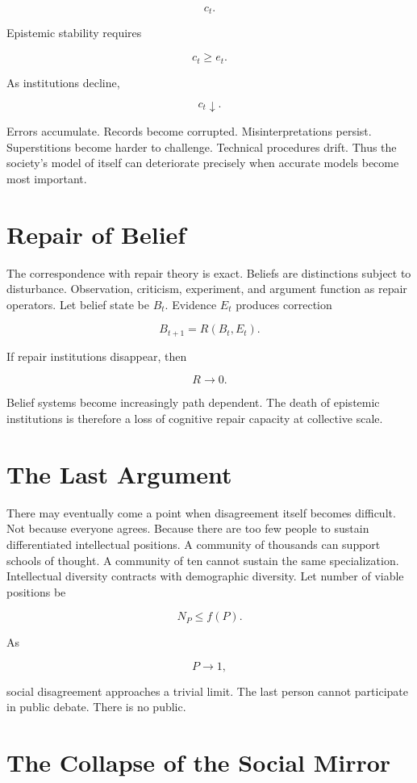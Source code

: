 \documentclass[11pt,oneside]{book}
\theoremstyle{definition}
\theoremstyle{remark}
\begin{document}
\[
c_t.
\]

Epistemic stability requires

\[
c_t\geq e_t.
\]

As institutions decline,

\[
c_t\downarrow.
\]

Errors accumulate. Records become corrupted. Misinterpretations persist. Superstitions become harder
to challenge. Technical procedures drift. Thus the society's model of itself can deteriorate
precisely when accurate models become most important.

\section{Repair of Belief}

The correspondence with repair theory is exact. Beliefs are distinctions subject to disturbance.
Observation, criticism, experiment, and argument function as repair operators. Let belief state be
\(B_t\). Evidence \(E_t\) produces correction

\[
B_{t+1} = R(B_t,E_t).
\]

If repair institutions disappear, then

\[
R\rightarrow0.
\]

Belief systems become increasingly path dependent. The death of epistemic institutions is therefore
a loss of cognitive repair capacity at collective scale.

\section{The Last Argument}

There may eventually come a point when disagreement itself becomes difficult. Not because everyone
agrees. Because there are too few people to sustain differentiated intellectual positions. A
community of thousands can support schools of thought. A community of ten cannot sustain the same
specialization. Intellectual diversity contracts with demographic diversity. Let number of viable
positions be

\[
N_P \leq f(P).
\]

As

\[
P\rightarrow1,
\]

social disagreement approaches a trivial limit. The last person cannot participate in public debate.
There is no public.

\section{The Collapse of the Social Mirror}
\end{document}
